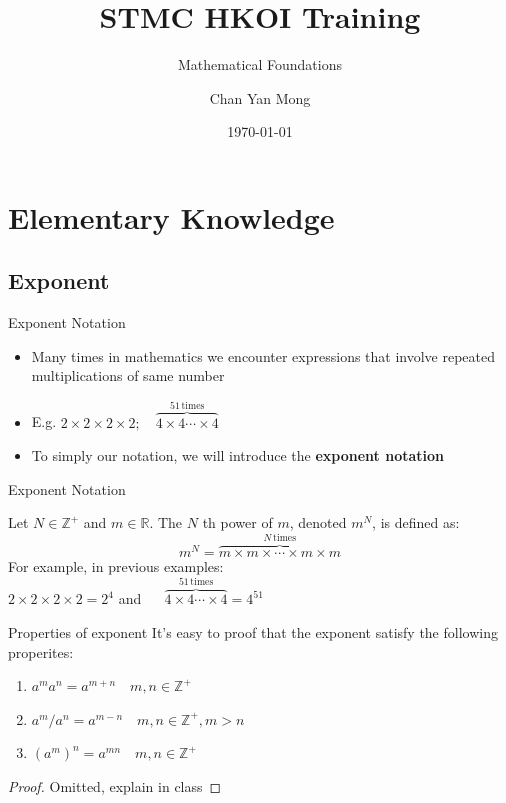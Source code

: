 \documentclass[10pt,xcolor={table,dvipsnames},t]{beamer}
\title[Your Short Title]{STMC HKOI Training}
\subtitle{Mathematical Foundations}
\author{Chan Yan Mong}
\date{\today}
\begin{document}
\begin{frame}
  \titlepage
\end{frame}


\section{Elementary Knowledge}
\subsection{Exponent}
\begin{frame}{Exponent Notation}
    \begin{itemize}
      \item Many times in mathematics we encounter expressions that involve repeated multiplications of same number
      \item E.g. $2\times 2 \times 2 \times 2; \quad \overbrace{4\times 4\cdots \times 4}^{51 \, \text{times}}$
      \item To simply our notation, we will introduce the \textbf{exponent notation}
    \end{itemize}
\end{frame}

\begin{frame}{Exponent Notation}
  \begin{definition}
    Let $N\in \mathbb{Z}^{+}$ and $m\in \mathbb{R}$. The $N$ th power of $m$, denoted $m^N$, is defined as:
    \begin{equation}
      m^N = \overbrace{m \times m \times \cdots \times m \times m}^{N\,\text{times}}
    \end{equation}
    For example, in previous examples:\\
     $2\times 2 \times 2 \times 2 = 2^4$ and $\quad$ $\overbrace{4\times 4\cdots \times 4}^{51 \, \text{times}} = 4^{51}$
  \end{definition}
\end{frame}

\begin{frame}{Properties of exponent}
  It's easy to proof that the exponent satisfy the following properites:
  \begin{theorem}
    \begin{enumerate}
      \item $a^m a^n = a^{m+n} \quad m,n\in \mathbb{Z}^+$
      \item $a^m/a^n = a^{m-n} \quad m,n \in \mathbb{Z}^+, m>n$
      \item $(a^m)^n = a^{mn} \quad m,n \in \mathbb{Z}^+$
    \end{enumerate}
    \begin{proof}
      Omitted, explain in class
    \end{proof}
  \end{theorem}
\end{frame}
\end{document}
